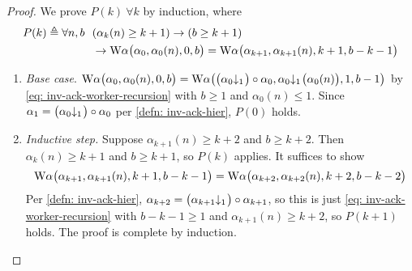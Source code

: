 \begin{proof}
	 We prove $P(k) \ \forall k$ by induction, where
	 \begin{equation*}
	 \begin{aligned}
	 P(k) \triangleq \forall n, b \ \ & (\alpha_k(n)\ge k+1) \to (b\ge k+1)\\ & \to \text{W}\alpha\big(\alpha_0, \alpha_0(n), 0, b\big) = \text{W}\alpha\big(\alpha_{k+1}, \alpha_{k+1}(n), k+1, b-k-1\big)
	 \end{aligned}
	 \end{equation*}
	\begin{enumerate}[leftmargin=*]
		\item \emph{Base case}. $ \W\alpha\big(\alpha_0, \alpha_0(n), 0, b\big) = \W\alpha\big(\cdt{\big(\alpha_0}{1}\big)\circ \alpha_0, \cdt{\alpha_0}{1}\big(\alpha_0(n)\big), 1, b - 1\big) $ by
		\eqref{eq: inv-ack-worker-recursion} with $b\ge 1$ and $\alpha_0(n)\le 1$. Since $\alpha_1 = \big(\cdt{\alpha_0}{1}\big) \circ \alpha_0$ per \cref{defn: inv-ack-hier}, $P(0)$ holds.
		
		\item \emph{Inductive step.} Suppose $\alpha_{k+1}(n)\ge k+2$ and $b\ge k+2$. Then $\alpha_k(n)\ge k+1$ and $b\ge k+1$, so $P(k)$ applies. It suffices to show
		\begin{equation*}
		\text{W}\alpha\big(\alpha_{k+1}, \alpha_{k+1}(n), k+1, b-k-1\big)
		= \text{W}\alpha\big(\alpha_{k+2}, \alpha_{k+2}(n), k+2, b-k-2\big)
		\end{equation*}
		Per \cref{defn: inv-ack-hier}, $\alpha_{k+2} = \big(\cdt{\alpha_{k+1}}{1}\big)\circ \alpha_{k+1}$, so this is just \eqref{eq: inv-ack-worker-recursion} with $b - k - 1\ge 1$ and $\alpha_{k+1}(n)\ge k+2$, so $P(k+1)$ holds. The proof is complete by induction.\vspace*{-\baselineskip}
	\end{enumerate}
\end{proof}
